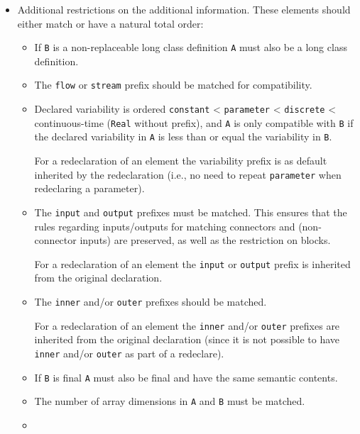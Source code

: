 \begin{itemize}
\item
  Additional restrictions on the additional information.
  These elements should either match or have a natural total order:
  \begin{itemize}
  \item
    If \lstinline!B! is a non-replaceable long class definition \lstinline!A! must also be a long class definition.
  \item
    The \lstinline!flow! or \lstinline!stream! prefix should be matched for compatibility.
  \item
    Declared variability is ordered \lstinline!constant! \textless{} \lstinline!parameter! \textless{} \lstinline!discrete! \textless{} continuous-time (\lstinline!Real! without prefix), and \lstinline!A! is only compatible with \lstinline!B! if the declared variability in \lstinline!A! is less than or equal the variability in \lstinline!B!.
    \begin{nonnormative}
    For a redeclaration of an element the variability prefix is as default inherited by the redeclaration (i.e., no need to repeat \lstinline!parameter! when redeclaring a parameter).
    \end{nonnormative}
  \item
    The \lstinline!input! and \lstinline!output! prefixes must be matched.
    This ensures that the rules regarding inputs/outputs for matching connectors and (non-connector inputs) are preserved, as well as the restriction on blocks.
    \begin{nonnormative}
    For a redeclaration of an element the \lstinline!input! or \lstinline!output! prefix is inherited from the original declaration.
    \end{nonnormative}
  \item
    The \lstinline!inner! and/or \lstinline!outer! prefixes should be matched.
    \begin{nonnormative}
    For a redeclaration of an element the \lstinline!inner! and/or \lstinline!outer! prefixes are inherited from the original declaration (since it is not possible to have \lstinline!inner! and/or \lstinline!outer! as part of a redeclare).
    \end{nonnormative}
  \item
    If \lstinline!B! is final \lstinline!A! must also be final and have the same semantic contents.
  \item
    The number of array dimensions in \lstinline!A! and \lstinline!B! must be matched.
  \item

\end{itemize}
\end{itemize}
